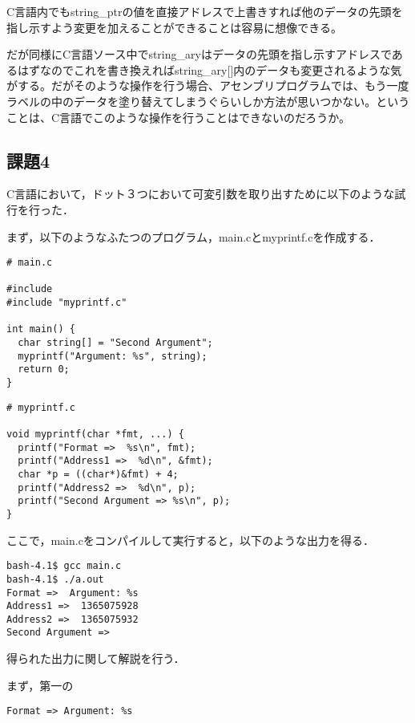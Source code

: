 \documentclass[a4j]{jarticle}
\begin{document}
C言語内でもstring\_ptrの値を直接アドレスで上書きすれば他のデータの先頭を指し示すよう変更を加えることができることは容易に想像できる。

だが同様にC言語ソース中でstring\_aryはデータの先頭を指し示すアドレスであるはずなのでこれを書き換えればstring\_ary[]内のデータも変更されるような気がする。だがそのような操作を行う場合、アセンブリプログラムでは、もう一度ラベルの中のデータを塗り替えてしまうぐらいしか方法が思いつかない。ということは、C言語でこのような操作を行うことはできないのだろうか。

\subsection{課題4}


C言語において，ドット３つにおいて可変引数を取り出すために以下のような試行を行った．

まず，以下のようなふたつのプログラム，main.cとmyprintf.cを作成する．

\begin{verbatim}
# main.c

#include
#include "myprintf.c"
 
int main() {
  char string[] = "Second Argument";
  myprintf("Argument: %s", string);
  return 0;
}
\end{verbatim}

\begin{verbatim}
# myprintf.c

void myprintf(char *fmt, ...) {
  printf("Format =>  %s\n", fmt);
  printf("Address1 =>  %d\n", &fmt);
  char *p = ((char*)&fmt) + 4;
  printf("Address2 =>  %d\n", p);
  printf("Second Argument => %s\n", p);
}

\end{verbatim}

ここで，main.cをコンパイルして実行すると，以下のような出力を得る．

\begin{verbatim}
bash-4.1$ gcc main.c 
bash-4.1$ ./a.out 
Format =>  Argument: %s
Address1 =>  1365075928
Address2 =>  1365075932
Second Argument => 
\end{verbatim}

得られた出力に関して解説を行う．

まず，第一の

\begin{verbatim}
Format => Argument: %s
\end{verbatim}
\end{document}
